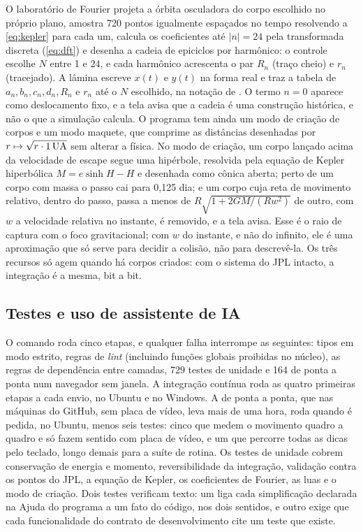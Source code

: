 O laboratório de Fourier projeta a órbita osculadora do corpo escolhido no próprio plano, amostra 720 pontos igualmente espaçados no tempo resolvendo a \autoref{eq:kepler} para cada um, calcula os coeficientes até $|n| = 24$ pela transformada discreta (\autoref{eq:dft}) e desenha a cadeia de epiciclos por harmônico: o controle escolhe $N$ entre 1 e 24, e cada harmônico acrescenta o par $R_n$ (traço cheio) e $r_n$ (tracejado). A lâmina escreve $x(t)$ e $y(t)$ na forma real e traz a tabela de $a_n, b_n, c_n, d_n, R_n$ e $r_n$ até o $N$ escolhido, na notação de . O termo $n=0$ aparece como deslocamento fixo, e a tela avisa que a cadeia é uma construção histórica, e não o que a simulação calcula. O programa tem ainda um modo de criação de corpos e um modo maquete, que comprime as distâncias desenhadas por $r\mapsto\sqrt{r\cdot 1\,\mathrm{UA}}$ sem alterar a física. No modo de criação, um corpo lançado acima da velocidade de escape segue uma hipérbole, resolvida pela equação de Kepler hiperbólica $M = e\sinh H - H$ e desenhada como cônica aberta; perto de um corpo com massa o passo cai para 0,125 dia; e um corpo cuja reta de movimento relativo, dentro do passo, passa a menos de $R\sqrt{1 + 2GM/(Rw^2)}$ de outro, com $w$ a velocidade relativa no instante, é removido, e a tela avisa. Esse é o raio de captura com o foco gravitacional; com $w$ do instante, e não do infinito, ele é uma aproximação que só serve para decidir a colisão, não para descrevê-la. Os três recursos só agem quando há corpos criados: com o sistema do JPL intacto, a integração é a mesma, bit a bit.

\subsection{Testes e uso de assistente de IA}\label{cap:processo}

O comando  roda cinco etapas, e qualquer falha interrompe as seguintes: tipos em modo estrito, regras de \emph{lint} (incluindo funções globais proibidas no núcleo), as regras de dependência entre camadas, 729 testes de unidade e 164 de ponta a ponta num navegador sem janela. A integração contínua roda as quatro primeiras etapas a cada envio, no Ubuntu e no Windows. A de ponta a ponta, que nas máquinas do GitHub, sem placa de vídeo, leva mais de uma hora, roda quando é pedida, no Ubuntu, menos seis testes: cinco que medem o movimento quadro a quadro e só fazem sentido com placa de vídeo, e um que percorre todas as dicas pelo teclado, longo demais para a suíte de rotina. Os testes de unidade cobrem conservação de energia e momento, reversibilidade da integração, validação contra os pontos do JPL, a equação de Kepler, os coeficientes de Fourier, as luas e o modo de criação. Dois testes verificam texto: um liga cada simplificação declarada na Ajuda do programa a um fato do código, nos dois sentidos, e outro exige que cada funcionalidade do contrato de desenvolvimento cite um teste que existe.

